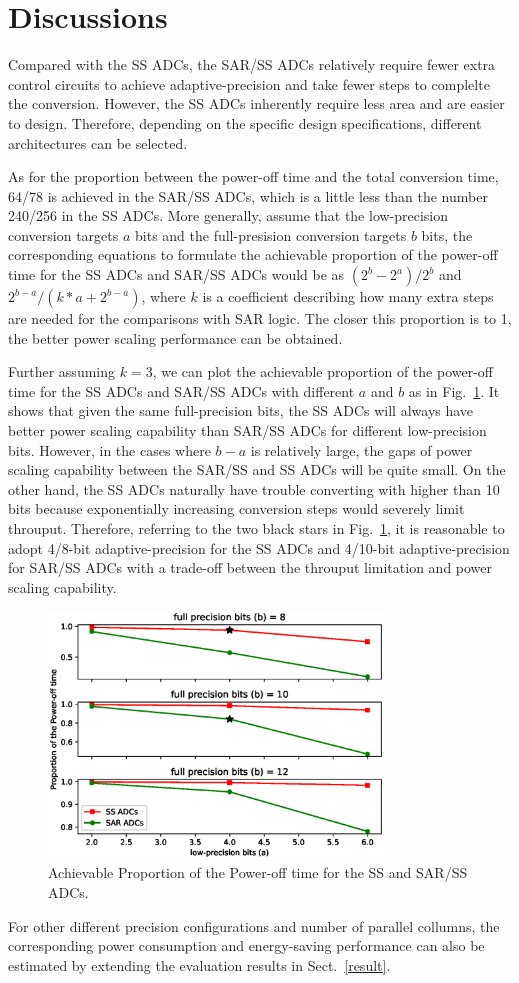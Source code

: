\section{Discussions}\label{discussion}

Compared with the SS ADCs, the SAR/SS ADCs relatively require fewer extra control circuits to achieve adaptive-precision and take fewer steps to complelte the conversion. However, the SS ADCs inherently require less area and are easier to design. Therefore, depending on the specific design specifications, different architectures can be selected. 

As for the proportion between the power-off time and the total conversion time, 64/78 is achieved in the SAR/SS ADCs, which is a little less than the number 240/256 in the SS ADCs. More generally, assume that the low-precision conversion targets $a$ bits and the full-presision conversion targets $b$ bits, the corresponding equations to formulate the achievable proportion of the power-off time for the SS ADCs and SAR/SS ADCs would be as $(2^b-2^a)/2^b$ and $2^{b-a}/(k*a+2^{b-a})$, where $k$ is a coefficient describing how many extra steps are needed for the comparisons with SAR logic.
The closer this proportion is to 1, the better power scaling performance can be obtained.

Further assuming $k=3$, we can plot the achievable proportion of the power-off time for the SS ADCs and SAR/SS ADCs with different $a$ and $b$ as in Fig.~\ref{Proportion}. 
It shows that given the same full-precision bits, the SS ADCs will always have better power scaling capability than SAR/SS ADCs for different low-precision bits. However, in the cases where $b-a$ is relatively large, the gaps of power scaling capability between the SAR/SS and SS ADCs will be quite small. On the other hand, the SS ADCs naturally have trouble converting with higher than 10 bits because exponentially increasing conversion steps would severely limit throuput. 
Therefore, referring to the two black stars in Fig.~\ref{Proportion}, it is reasonable to adopt 4/8-bit adaptive-precision for the SS ADCs and 4/10-bit adaptive-precision for SAR/SS ADCs with a trade-off between the throuput limitation and power scaling capability.

\begin{figure}[htbp]
	\centerline{\includegraphics[width=3.5in]{./Figures/Proportion.eps}}
	\caption{Achievable Proportion of the Power-off time for the SS and SAR/SS ADCs.}
	\label{Proportion}
\end{figure} 

For other different precision configurations and number of parallel collumns, 
the corresponding power consumption and energy-saving performance can also be estimated by extending the evaluation results in Sect.~\ref{result}.